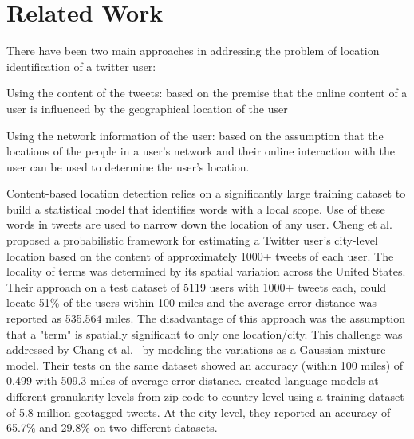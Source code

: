 \section{Related Work}
\label{sec:RelatedWork}
There have been two main approaches in addressing the problem of location identification of a twitter user: \begin{inparaenum}[(1)] 
\item Using the content of the tweets: based on the premise that the online content of a user is influenced by the geographical location of the user
\item Using the network information of the user: based on the assumption that the locations of the people in a user's network and their online interaction with the user can be used to determine the user's location.
\end{inparaenum}

Content-based location detection relies on a significantly large training dataset to build a statistical model that identifies words with a local scope. Use of these words in tweets are used to narrow down the location of any user. Cheng et al. \cite{cheng2010you} proposed a probabilistic framework for estimating a Twitter user's city-level location based on the content of approximately 1000+ tweets of each user. The locality of terms was determined by its spatial variation across the United States. Their approach on a test dataset of 5119 users with 1000+ tweets each, could locate 51\% of the users within 100 miles and the average error distance was reported as 535.564 miles. The disadvantage of this approach was the assumption that a "term" is spatially significant to only one location/city. This challenge was addressed by Chang et al.~\cite{chang2012phillies} by modeling the variations as a Gaussian mixture model. Their tests on the same dataset showed an accuracy (within 100 miles) of 0.499 with 509.3 miles of average error distance.
\cite{ferrara2012web} created language models at different granularity levels from zip code to country level using a training dataset of 5.8 million geotagged tweets. At the city-level, they reported an accuracy of 65.7\% and 29.8\% on two different datasets.

